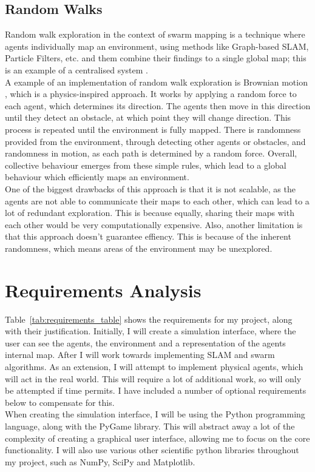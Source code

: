 \documentclass[12pt]{article}
\begin{document}
\subsection{Random Walks}
Random walk exploration in the context of swarm mapping is a technique where agents individually map an environment, using
methods like Graph-based SLAM, Particle Filters, etc. and them combine their findings to a single global map; this is an
example of a centralised system \cite{swarm_random_walks}.\\
A example of an implementation of random walk exploration is Brownian motion \cite{brownian_motion}, which is a physics-inspired
approach. It works by applying a random force to each agent, which determines its direction. The agents then move in this
direction until they detect an obstacle, at which point they will change direction. This process is repeated until the
environment is fully mapped. There is randomness provided from the environment, through detecting other agents or obstacles,
and randomness in motion, as each path is determined by a random force. Overall, collective behaviour emerges from these simple
rules, which lead to a global behaviour which efficiently maps an environment.\\
One of the biggest drawbacks of this approach is that it is not scalable, as the agents are not able to communicate their
maps to each other, which can lead to a lot of redundant exploration. This is because equally, sharing their maps with each
other would be very computationally expensive. Also, another limitation is that this approach doesn't guarantee effiency.
This is because of the inherent randomness, which means areas of the environment may be unexplored.\\

\section{Requirements Analysis}
Table~\ref{tab:requirements_table} shows the requirements for my project, along with their justification. Initially, I will
create a simulation interface, where the user can see the agents, the environment and a representation of the agents internal
map. After I will work towards implementing SLAM and swarm algorithms. As an extension, I will attempt to implement physical
agents, which will act in the real world. This will require a lot of additional work, so will only be attempted if time permits.
I have included a number of optional requirements below to compensate for this.\\
When creating the simulation interface, I will be using the Python programming language, along with the PyGame library. This
will abstract away a lot of the complexity of creating a graphical user interface, allowing me to focus on the core functionality.
I will also use various other scientific python libraries throughout my project, such as NumPy, SciPy and Matplotlib.\\
\end{document}
